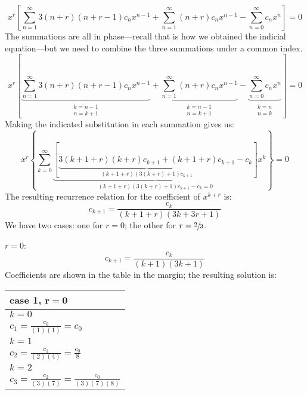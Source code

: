 \begin{equation*}
x^r \left[\sum\limits_{n=1}^{\infty} 3(n+r)(n+r-1)c_nx^{n-1} + \sum\limits_{n=1}^{\infty} (n+r)c_nx^{n-1} - \sum\limits_{n=0}^{\infty}c_nx^n \right] = 0
\end{equation*}
The summations are all in phase---recall that is how we obtained the indicial equation---but we need to combine the three summations under a common index.
\begin{equation*}
x^r \left[\underbrace{\sum\limits_{n=1}^{\infty} 3(n+r)(n+r-1)c_nx^{n-1}}_{\substack{k=n-1 \\ n=k+1}} + \underbrace{\sum\limits_{n=1}^{\infty} (n+r)c_nx^{n-1}}_{\substack{k=n-1 \\ n=k+1}} - \underbrace{\sum\limits_{n=0}^{\infty}c_nx^n}_{\substack{k=n \\n=k}} \right] = 0
\end{equation*}
Making the indicated substitution in each summation gives us:
\begin{equation*}
x^r\left\{\sum\limits_{k=0}^{\infty} \underbrace{\left[\underbrace{3(k+1+r)(k+r)c_{k+1}+(k+1+r)c_{k+1}}_{(k+1+r)(3(k+r)+1)c_{k+1}} - c_k\right]}_{(k+1+r)(3(k+r)+1)c_{k+1} - c_k = 0}x^k\right\} = 0
\end{equation*}
The resulting recurrence relation for the coefficient of $x^{k+r}$ is:
\begin{equation*}
c_{k+1}=\frac{c_k}{(k+1+r)(3k+3r+1)}
\end{equation*}
We have two cases: one for $r=0$; the other for $r = \sfrac{2}{3}$.

\vspace{0.25cm}
\noindent\underline{$r=0$}:
\begin{equation*}
c_{k+1} = \frac{c_k}{(k+1)(3k+1)}
\end{equation*}
\noindent Coefficients are shown in the table in the margin; the resulting solution is:
\begin{margintable}
\begin{tabular}{|l|} 
\hline
\textbf{case 1, } $\mathbf{r = 0}$ \\\hline
$k = 0$ \\
$c_1 = \frac{c_0}{(1)(1)} = c_0$ \\\hline
$k = 1$ \\
$c_2 = \frac{c_1}{(2)(4)} = \frac{c_0}{8}$ \\\hline
$k=2$ \\
$c_3 = \frac{c_2}{(3)(7)} = \frac{c_0}{(3)(7)(8)}$\\\hline
\end{tabular}
\end{margintable}

